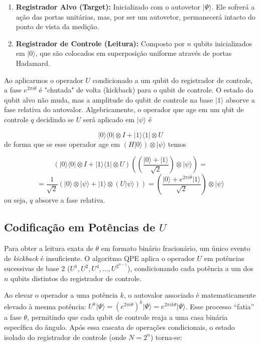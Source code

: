 \documentclass[12pt, a4paper]{article}
\newcommand{\ket}[1]{\lvert #1 \rangle}
\newcommand{\bra}[1]{\langle #1 \rvert}
\begin{document}
\begin{enumerate}
    \item \textbf{Registrador Alvo (Target):} Inicializado com o autovetor $\ket{\Psi}$. Ele sofrerá a ação das portas unitárias, mas, por ser um autovetor, permanecerá intacto do ponto de vista da medição.
    \item \textbf{Registrador de Controle (Leitura):} Composto por $n$ qubits inicializados em $\ket{0}$, que são colocados em superposição uniforme através de portas Hadamard.
\end{enumerate}

Ao aplicarmos o operador $U$ condicionado a um qubit do registrador de controle, a fase $e^{2\pi i \theta}$ é "chutada" de volta (kickback) para o qubit de controle. O estado do qubit alvo não muda, mas a amplitude do qubit de controle na base $\ket{1}$ absorve a fase relativa do autovalor. Algebricamente, o operador que age em um qbit de controle $q$ decidindo se $U$ será aplicado em $\ket{\psi}$ é

\begin{equation}
    \ket{0}\!\bra{0} \otimes I + \ket{1}\!\bra{1} \otimes U
\end{equation}
de forma que se esse operador age em $(H\ket{0})\otimes \ket{\psi}$ temos

\[
    \left(\ket{0}\!\bra{0} \otimes I + \ket{1}\!\bra{1} \otimes U\right)\left(\left(\frac{\ket{0} + \ket{1}}{\sqrt{2}}\right)\otimes \ket{\psi}\right) = 
\]
\begin{equation}
= \frac{1}{\sqrt{2}}(\ket{0}\otimes\ket{\psi} + \ket{1}\otimes (U\ket{\psi})) = \left(\frac{\ket{0} + e^{2\pi i \theta}\ket{1}}{\sqrt{2}}\right)\otimes \ket{\psi}
\end{equation}
ou seja, $q$ absorve a fase relativa.

\subsection{Codificação em Potências de $U$}

Para obter a leitura exata de $\theta$ em formato binário fracionário, um único evento de \textit{kickback} é insuficiente. O algoritmo QPE aplica o operador $U$ em potências sucessivas de base 2 ($U^1, U^2, U^4, \dots, U^{2^{n-1}}$), condicionando cada potência a um dos $n$ qubits distintos do registrador de controle.

Ao elevar o operador a uma potência $k$, o autovalor associado é matematicamente elevado à mesma potência: $U^k\ket{\Psi} = (e^{2\pi i \theta})^k\ket{\Psi} = e^{2\pi i k \theta}\ket{\Psi}$. Esse processo ``fatia'' a fase $\theta$, permitindo que cada qubit de controle reaja a uma casa binária específica do ângulo. Após essa cascata de operações condicionais, o estado isolado do registrador de controle (onde $N = 2^n$) torna-se:
\end{document}
